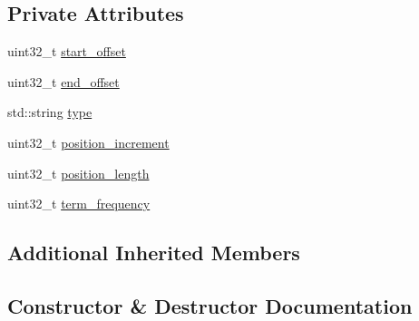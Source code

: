\subsection*{Private Attributes}
\begin{DoxyCompactItemize}
\item 
uint32\+\_\+t \mbox{\hyperlink{classlucene_1_1core_1_1analysis_1_1tokenattributes_1_1PackedTokenAttributeImpl_a15d9f4ff5be2008f86e853cabff85566}{start\+\_\+offset}}
\item 
uint32\+\_\+t \mbox{\hyperlink{classlucene_1_1core_1_1analysis_1_1tokenattributes_1_1PackedTokenAttributeImpl_ae3b9bf799d0a6645eafbda1b01094e81}{end\+\_\+offset}}
\item 
std\+::string \mbox{\hyperlink{classlucene_1_1core_1_1analysis_1_1tokenattributes_1_1PackedTokenAttributeImpl_a39f37a016d846f19589fda8383489164}{type}}
\item 
uint32\+\_\+t \mbox{\hyperlink{classlucene_1_1core_1_1analysis_1_1tokenattributes_1_1PackedTokenAttributeImpl_ab999325a1f0d535a767f924fcd3954c5}{position\+\_\+increment}}
\item 
uint32\+\_\+t \mbox{\hyperlink{classlucene_1_1core_1_1analysis_1_1tokenattributes_1_1PackedTokenAttributeImpl_aaed2579a261b29b608ed68aa2b7728fd}{position\+\_\+length}}
\item 
uint32\+\_\+t \mbox{\hyperlink{classlucene_1_1core_1_1analysis_1_1tokenattributes_1_1PackedTokenAttributeImpl_a415328f42ee5fc7e0a39479b7e3a8f67}{term\+\_\+frequency}}
\end{DoxyCompactItemize}
\subsection*{Additional Inherited Members}


\subsection{Constructor \& Destructor Documentation}
\mbox{\label{classlucene_1_1core_1_1analysis_1_1tokenattributes_1_1PackedTokenAttributeImpl_a11dff73c5a672c0fc89c2f69b5d6366d}} 
